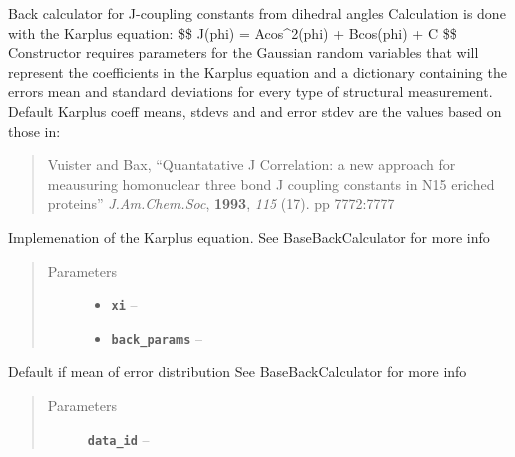 \documentclass[letterpaper,10pt,english]{sphinxmanual}
\begin{document}
\begin{fulllineitems}
\label{modules:backcalc.JCoupBackCalc}
Back calculator for J-coupling constants from dihedral angles
Calculation is done with the Karplus equation: \$\$ J(phi) = Acos\textasciicircum{}2(phi) + Bcos(phi) + C \$\$
Constructor requires parameters for the Gaussian random variables
that will represent the coefficients in the Karplus equation
and a dictionary containing the errors mean and standard deviations
for every type of structural measurement. Default Karplus coeff means,
stdevs and and error stdev are the values based on those in:
\begin{quote}

Vuister and Bax, ``Quantatative J Correlation: a new approach for meausuring homonuclear
three bond J coupling constants in N15 eriched proteins'' \emph{J.Am.Chem.Soc}, \textbf{1993},
\emph{115} (17). pp 7772:7777
\end{quote}

\begin{fulllineitems}
\label{modules:backcalc.JCoupBackCalc.back_calc}
Implemenation of the Karplus equation. See BaseBackCalculator for more
info
\begin{quote}\begin{description}
\item[{Parameters}] \leavevmode\begin{itemize}
\item {} 
\textbf{\texttt{xi}} -- 

\item {} 
\textbf{\texttt{back\_params}} -- 

\end{itemize}

\end{description}\end{quote}

\end{fulllineitems}


\begin{fulllineitems}
\label{modules:backcalc.JCoupBackCalc.get_default_err}
Default if mean of error distribution See BaseBackCalculator for more
info
\begin{quote}\begin{description}
\item[{Parameters}] \leavevmode
\textbf{\texttt{data\_id}} -- 


\end{description}
\end{quote}
\end{fulllineitems}
\end{fulllineitems}
\end{document}
